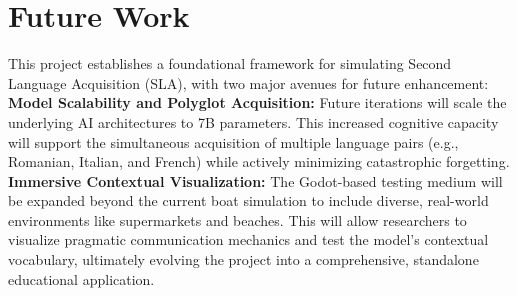 \section{Future Work}
\label{sec:future_work}

This project establishes a foundational framework for simulating Second Language Acquisition (SLA), with two major avenues for future enhancement:\\

\textbf{Model Scalability and Polyglot Acquisition:} Future iterations will scale the underlying AI architectures to 7B parameters. This increased cognitive capacity will support the simultaneous acquisition of multiple language pairs (e.g., Romanian, Italian, and French) while actively minimizing catastrophic forgetting.\\

\textbf{Immersive Contextual Visualization:} The Godot-based testing medium will be expanded beyond the current boat simulation to include diverse, real-world environments like supermarkets and beaches. This will allow researchers to visualize pragmatic communication mechanics and test the model's contextual vocabulary, ultimately evolving the project into a comprehensive, standalone educational application.